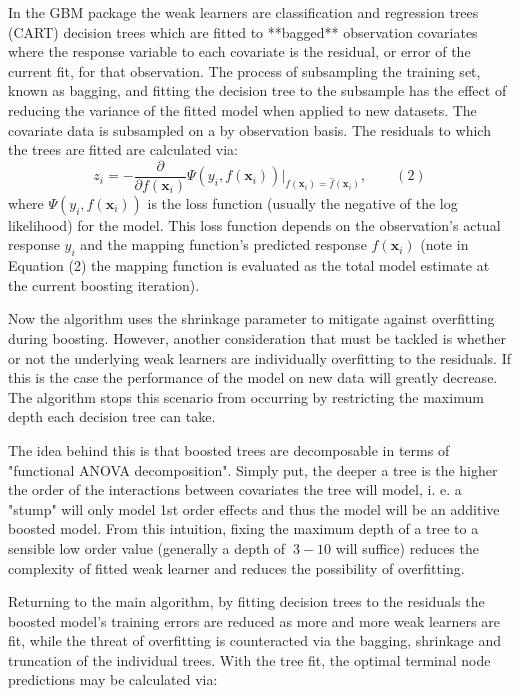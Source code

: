 \documentclass{article}
\begin{document}
In the GBM package the weak learners are classification and regression trees (CART) decision trees which are fitted to **bagged** observation covariates where the response variable to each covariate is the residual, or error of the current fit, for that observation. The process of subsampling the training set, known as bagging, and fitting the decision tree to the subsample has the effect of reducing the variance of the fitted model when applied to new datasets.  The covariate data is subsampled on a by observation basis. The residuals to which the trees are fitted are calculated via:
$$ z_{i} = -\frac{\partial}{\partial f(\textbf{x}_{\textit{i}})}\Psi(\textit{y}_{\textit{i}},f(\textbf{x}_\textit{i}))|_{f(\textbf{x}_i) = \hat{f}(\textbf{x}_i)},   \qquad (2)$$
where $\Psi(y_i, f(\textbf{x}_i))$ is the loss function (usually the negative of the log likelihood) for the model. This loss function depends on the observation's actual response $y_i$ and the mapping function's predicted response $f(\textbf{x}_i)$ (note in Equation (2) the mapping function is evaluated as the total model estimate at the current boosting iteration).

Now the algorithm uses the shrinkage parameter to mitigate against overfitting during boosting. However, another consideration that must be tackled is whether or not the underlying weak learners are individually overfitting to the residuals.  If this is the case the performance of the model on new data will greatly decrease.  The algorithm stops this scenario from occurring by restricting the maximum depth each decision tree can take. 

The idea behind this is that boosted trees are decomposable in terms of "functional ANOVA decomposition". Simply put, the deeper a tree is the higher the order of the interactions between covariates the tree will model, i. e. a "stump" will only model 1st order effects and thus the model will be an additive boosted model.  From this intuition, fixing the maximum depth of a tree to a sensible low order value (generally a depth of $~3-10$ will suffice) reduces the complexity of fitted weak learner and reduces the possibility of overfitting.

Returning to the main algorithm, by fitting decision trees to the residuals the boosted model's training errors are reduced as more and more weak learners are fit, while the threat of overfitting is counteracted via the bagging, shrinkage and truncation of the individual trees. With the tree fit, the optimal terminal node predictions may be calculated via:
\end{document}
